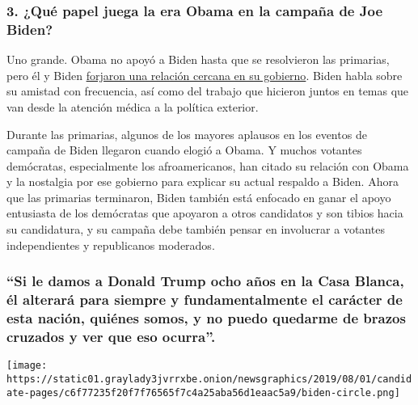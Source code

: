 \hypertarget{3-quuxe9-papel-juega-la-era-obama-en-la-campauxf1a-de-joe-biden}{%
\subsubsection{\texorpdfstring{\textbf{3. ¿Qué papel juega la era Obama
en la campaña de Joe
Biden?}}{3. ¿Qué papel juega la era Obama en la campaña de Joe Biden?}}\label{3-quuxe9-papel-juega-la-era-obama-en-la-campauxf1a-de-joe-biden}}

Uno grande. Obama no apoyó a Biden hasta que se resolvieron las
primarias, pero él y Biden
\href{https://www.nytimes3xbfgragh.onion/2019/08/16/us/politics/biden-obama-history.html}{forjaron
una relación cercana en su gobierno}. Biden habla sobre su amistad con
frecuencia, así como del trabajo que hicieron juntos en temas que van
desde la atención médica a la política exterior.

Durante las primarias, algunos de los mayores aplausos en los eventos de
campaña de Biden llegaron cuando elogió a Obama. Y muchos votantes
demócratas, especialmente los afroamericanos, han citado su relación con
Obama y la nostalgia por ese gobierno para explicar su actual respaldo a
Biden. Ahora que las primarias terminaron, Biden también está enfocado
en ganar el apoyo entusiasta de los demócratas que apoyaron a otros
candidatos y son tibios hacia su candidatura, y su campaña debe también
pensar en involucrar a votantes independientes y republicanos moderados.

\hypertarget{si-le-damos-a-donald-trump-ocho-auxf1os-en-la-casa-blanca-uxe9l-alteraruxe1-para-siempre-y-fundamentalmente-el-caruxe1cter-de-esta-naciuxf3n-quiuxe9nes-somos-y-no-puedo-quedarme-de-brazos-cruzados-y-ver-que-eso-ocurra}{%
\subsubsection{``Si le damos a Donald Trump ocho años en la Casa Blanca,
él alterará para siempre y fundamentalmente el carácter de esta nación,
quiénes somos, y no puedo quedarme de brazos cruzados y ver que eso
ocurra''.}\label{si-le-damos-a-donald-trump-ocho-auxf1os-en-la-casa-blanca-uxe9l-alteraruxe1-para-siempre-y-fundamentalmente-el-caruxe1cter-de-esta-naciuxf3n-quiuxe9nes-somos-y-no-puedo-quedarme-de-brazos-cruzados-y-ver-que-eso-ocurra}}

\texttt{[image: https://static01.graylady3jvrrxbe.onion/newsgraphics/2019/08/01/candidate-pages/c6f77235f20f7f76565f7c4a25aba56d1eaac5a9/biden-circle.png]}

